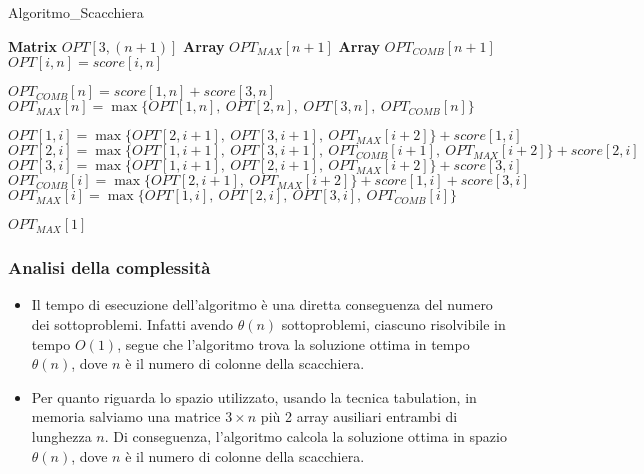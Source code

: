 \begin{algorithm}
	\caption{Algoritmo\_Scacchiera}
	\begin{algorithmic}[1]
		\State {}
		\State \textbf{Matrix} $OPT[3, (n + 1)]$ 
		\State \textbf{Array} $OPT_{MAX}[n + 1]$
		\State \textbf{Array} $OPT_{COMB}[n + 1]$ 
		\State {}
		\State $OPT[i, n] = score[i, n]$
		\EndFor
		
		\State $OPT_{COMB}[n] = score[1,n] + score[3,n]$
		\State $OPT_{MAX}[n] = \max\{OPT[1,n],\ OPT[2,n],\ OPT[3,n],\ OPT_{COMB}[n]\}$
		\State {}
		
		\State {}
		\State $OPT[1, i] = \max\{OPT[2, i + 1],\ OPT[3, i + 1],\ OPT_{MAX}[i + 2]\} + score[1, i]$\\
		
		\State $OPT[2, i] = \max\{OPT[1, i + 1],\ OPT[3, i + 1],\ OPT_{COMB}[i + 1],\ OPT_{MAX}[i + 2]\} + score[2, i]$\\
		
		\State $OPT[3, i] = \max\{OPT[1, i + 1],\ OPT[2, i + 1],\ OPT_{MAX}[i + 2]\} + score[3, i]$\\
		
		\State $OPT_{COMB}[i] = \max\{OPT[2, i + 1],\ OPT_{MAX}[i + 2]\} + score[1, i] + score[3, i]$\\
		
		\State $OPT_{MAX}[i] = \max\{OPT[1, i],\ OPT[2, i],\ OPT[3, i],\ OPT_{COMB}[i]\}$
		\EndFor
		
		\Return $OPT_{MAX}[1]$
		\EndFunction
	\end{algorithmic}
\end{algorithm}

\subsubsection*{Analisi della complessità}

\begin{itemize}
	\item{
		Il tempo di esecuzione dell'algoritmo è una diretta conseguenza del numero dei sottoproblemi. Infatti avendo $\theta(n)$ sottoproblemi,
		ciascuno risolvibile in tempo $O(1)$, segue che l'algoritmo trova la soluzione ottima in tempo $\theta(n)$, dove $n$ è il numero di colonne della scacchiera.
	}
	\item{
		Per quanto riguarda lo spazio utilizzato, usando la tecnica tabulation, in memoria salviamo una matrice $3 \times n$ più 2 array ausiliari entrambi di lunghezza $n$.
		Di conseguenza, l'algoritmo calcola la soluzione ottima in spazio $\theta(n)$, dove $n$ è il numero di colonne della scacchiera. 
	}
\end{itemize}


